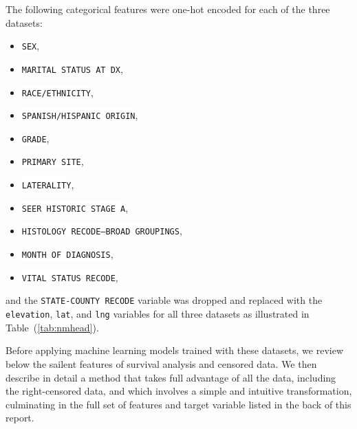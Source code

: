 \documentclass[10pt,letterpaper]{article}
\newcommand{\codewhite}[1]{\colorbox{white}{\texttt{#1}}}
\begin{document}
The following categorical features were one-hot encoded for each of the three datasets:

\begin{itemize}[noitemsep]
\item \codewhite{SEX},
\item  \codewhite{MARITAL STATUS AT DX},
\item \codewhite{RACE/ETHNICITY},
\item \codewhite{SPANISH/HISPANIC ORIGIN},
\item \codewhite{GRADE},
\item \codewhite{PRIMARY SITE},
\item \codewhite{LATERALITY},
\item \codewhite{SEER HISTORIC STAGE A},
\item \codewhite{HISTOLOGY RECODE--BROAD GROUPINGS},
\item \codewhite{MONTH OF DIAGNOSIS},
\item  \codewhite{VITAL STATUS RECODE},
\end{itemize}
and the \codewhite{STATE-COUNTY RECODE} variable was dropped and replaced with the \codewhite{elevation}, \codewhite{lat}, and \codewhite{lng} variables for all three datasets as illustrated in Table~(\ref{tab:nmhead}).

Before applying machine learning models trained with these datasets, we review below the sailent features of survival analysis and censored data. We then describe in detail a method that takes full advantage of all the data, including the right-censored data, and which involves a simple and intuitive transformation, culminating in the full set of features and target variable listed in the back of this report.



\end{document}
